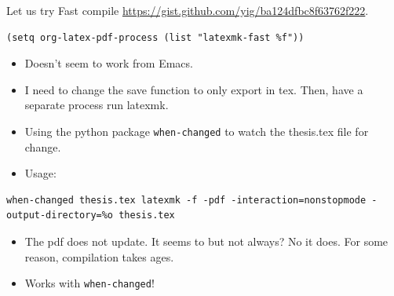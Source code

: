 \documentclass[letterpaper, 12pt]{report}
\begin{document}
Let us try Fast compile \url{https://gist.github.com/yig/ba124dfbc8f63762f222}.

\begin{verbatim}
(setq org-latex-pdf-process (list "latexmk-fast %f"))
\end{verbatim}

\begin{itemize}
\item Doesn't seem to work from Emacs.
\item I need to change the save function to only export in tex. Then, have a separate process run latexmk.
\item Using the python package \texttt{when-changed} to watch the thesis.tex file for change.
\item Usage:
\end{itemize}

\begin{verbatim}
when-changed thesis.tex latexmk -f -pdf -interaction=nonstopmode -output-directory=%o thesis.tex
\end{verbatim}

\begin{itemize}
\item The pdf does not update. It seems to but not always? No it does. For some reason, compilation takes ages.
\item Works with \texttt{when-changed}!
\end{itemize}
\end{document}
